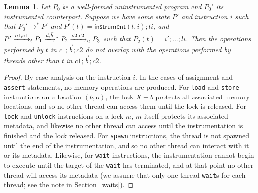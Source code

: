 \documentclass[preprint, 10pt]{sigplanconf}
\newcommand{\instr}[2]{\ensuremath{\mathsf{instrument}(#1, #2)}}
\newcommand{\tto}[1]{\mathrel{
  \vphantom{\xrightarrow{#1}}
  \smash{\xrightarrow{#1}}
  \vphantom{\to}^{*}}
}
\newtheorem{lemma}{Lemma}
\begin{document}
\begin{lemma}\label{indep}Let $P_0$ be a well-formed uninstrumented program and $P_0'$ its instrumented counterpart. Suppose we have some state $P'$ and instruction $i$ such that $P_0' \rightarrow^{*} P'$ and $P'(t) = \instr{t}{i}; \mathit{li}$, and $P' \xrightarrow{o1, c1}_t P_1 \tto{\vec{a}, \vec{b}} P_2 \xrightarrow{o2, c2}_u P_3$ such that $P_2(t) = i'; ...; \mathit{li}$. Then the operations performed by $t$ in $c1; \vec{b}; c2$ do not overlap with the operations performed by threads other than $t$ in $c1; \vec{b}; c2$.\end{lemma}
\begin{proof}By case analysis on the instruction $i$. In the cases of assignment and \texttt{assert} statements, no memory operations are produced. For \texttt{load} and \texttt{store} instructions on a location $(b, o)$, the lock $X + b$ protects all associated memory locations, and so no other thread can access them until the lock is released. For \texttt{lock} and \texttt{unlock} instructions on a lock $m$, $m$ itself protects its associated metadata, and likewise no other thread can access until the instrumentation is finished and the lock released. For \texttt{spawn} instructions, the thread is not spawned until the end of the instrumentation, and so no other thread can interact with it or its metadata. Likewise, for \texttt{wait} instructions, the instrumentation cannot begin to execute until the target of the \texttt{wait} has terminated, and at that point no other thread will access its metadata (we assume that only one thread \texttt{wait}s for each thread; see the note in Section~\ref{waits}).\end{proof}
\end{document}
